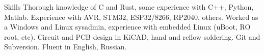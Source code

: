 
\begin{rubric}{Skills}
\entry*[Programming]
  Thorough knowledge of C and Rust, some experience with C++, Python, Matlab.
\entry*[Microcontrollers]
  Experience with AVR, STM32, ESP32/8266, RP2040, others.
  Worked as a Windows and Linux sysadmin, experience with embedded Linux (uBoot, RO root, etc).
\entry*[EDA]
  Circuit and PCB design in KiCAD, hand and reflow soldering.
\entry*[VCS]
  Git and Subversion.
\entry*[Languages]
  Fluent in English, Russian.
\end{rubric}
